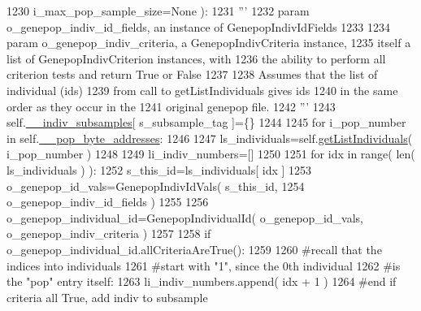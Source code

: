 \begin{DoxyCode}
1230                                             i\_max\_pop\_sample\_size=\textcolor{keywordtype}{None} ):
1231         \textcolor{stringliteral}{'''}
1232 \textcolor{stringliteral}{        param o\_genepop\_indiv\_id\_fields, an instance of GenepopIndivIdFields}
1233 \textcolor{stringliteral}{}
1234 \textcolor{stringliteral}{        param o\_genepop\_indiv\_criteria, a GenepopIndivCriteria instance,}
1235 \textcolor{stringliteral}{            itself a list of GenepopIndivCriterion instances, with}
1236 \textcolor{stringliteral}{            the ability to perform all criterion tests and return True or False}
1237 \textcolor{stringliteral}{}
1238 \textcolor{stringliteral}{        Assumes that the list of individual (ids)}
1239 \textcolor{stringliteral}{        from call to getListIndividuals gives ids}
1240 \textcolor{stringliteral}{        in the same order as they occur in the }
1241 \textcolor{stringliteral}{        original genepop file.}
1242 \textcolor{stringliteral}{        '''}
1243         self.\hyperlink{classnegui_1_1genepopfilemanager_1_1GenepopFileManager_a1e8379bcee4902ca9314ff53fcb71644}{\_\_indiv\_subsamples}[ s\_subsample\_tag ]=\{\}
1244 
1245         \textcolor{keywordflow}{for} i\_pop\_number \textcolor{keywordflow}{in} self.\hyperlink{classnegui_1_1genepopfilemanager_1_1GenepopFileManager_ae24c2bdd19136a345bdb42fd49c5d91f}{\_\_pop\_byte\_addresses}:
1246 
1247             ls\_individuals=self.\hyperlink{classnegui_1_1genepopfilemanager_1_1GenepopFileManager_aa6993dde24163002aeae55005437711d}{getListIndividuals}( i\_pop\_number )
1248 
1249             li\_indiv\_numbers=[]
1250 
1251             \textcolor{keywordflow}{for} idx \textcolor{keywordflow}{in} range( len( ls\_individuals ) ):
1252                 s\_this\_id=ls\_individuals[ idx ]
1253                 o\_genepop\_id\_vals=GenepopIndivIdVals( s\_this\_id, 
1254                                             o\_genepop\_indiv\_id\_fields )
1255 
1256                 o\_genepop\_individual\_id=GenepopIndividualId( o\_genepop\_id\_vals, o\_genepop\_indiv\_criteria )
1257                 
1258                 \textcolor{keywordflow}{if} o\_genepop\_individual\_id.allCriteriaAreTrue():
1259 
1260                     \textcolor{comment}{#recall that the indices into individuals }
1261                     \textcolor{comment}{#start with "1", since the 0th individual}
1262                     \textcolor{comment}{#is the "pop" entry itself:}
1263                     li\_indiv\_numbers.append( idx + 1 )
1264                 \textcolor{comment}{#end if criteria all True, add indiv to subsample}

\end{DoxyCode}
